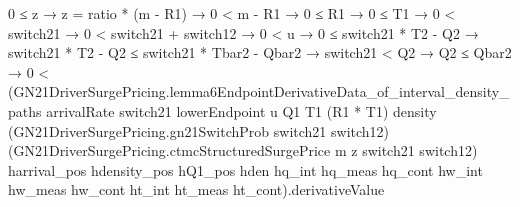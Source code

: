 \documentclass[10pt]{article}
\begin{document}
\begin{ReviewVerbatim}
          0 ≤ z →
            z = ratio * (m - R1) →
              0 < m - R1 →
                0 ≤ R1 →
                  0 ≤ T1 →
                    0 < switch21 →
                      0 < switch21 + switch12 →
                        0 < u →
                          0 ≤ switch21 * T2 - Q2 →
                            switch21 * T2 - Q2 ≤ switch21 * Tbar2 - Qbar2 →
                              switch21 < Q2 →
                                Q2 ≤ Qbar2 →
                                  0 <
                                    (GN21DriverSurgePricing.lemma6EndpointDerivativeData_of_interval_density_paths
                                        arrivalRate switch21 lowerEndpoint u Q1 T1 (R1 * T1) density
                                        (GN21DriverSurgePricing.gn21SwitchProb switch21 switch12)
                                        (GN21DriverSurgePricing.ctmcStructuredSurgePrice m z switch21 switch12)
                                        harrival_pos hdensity_pos hQ1_pos hden hq_int hq_meas hq_cont hw_int hw_meas
                                        hw_cont ht_int ht_meas ht_cont).derivativeValue
\end{ReviewVerbatim}
\end{document}
